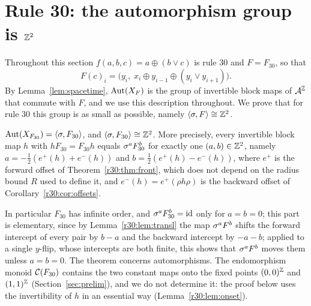 \section{Rule 30: the automorphism group is \texorpdfstring{$\mathbb{Z}^2$}{Z\^{}2}}\label{sec:rigidity30}

Throughout this section $f(a,b,c)=a\oplus(b\vee c)$ is rule $30$ and $F=F_{30}$, so that
\[
F(c)_i=\bigl(y_i,\;x_i\oplus y_{i-1}\oplus(y_i\vee y_{i+1})\bigr).
\]
By Lemma~\ref{lem:spacetime}, $\operatorname{Aut}(X_F)$ is the group of invertible block maps of $\mathcal{A}^{\mathbb{Z}}$ that commute with $F$, and we use this description throughout. We prove that for rule $30$ this group is as small as possible, namely $\langle\sigma,F\rangle\cong\mathbb{Z}^2$.

\begin{theorem}\label{thm:rigidity30}
$\operatorname{Aut}(X_{F_{30}})=\langle\sigma,F_{30}\rangle$, and $\langle\sigma,F_{30}\rangle\cong\mathbb{Z}^2$. More precisely, every invertible block map $h$ with $hF_{30}=F_{30}h$ equals $\sigma^aF_{30}^b$ for exactly one $(a,b)\in\mathbb{Z}^2$, namely $a=-\tfrac12(e^+(h)+e^-(h))$ and $b=\tfrac12(e^+(h)-e^-(h))$, where $e^+$ is the forward offset of Theorem~\ref{r30:thm:front}, which does not depend on the radius bound $R$ used to define it, and $e^-(h)=e^+(\rho h\rho)$ is the backward offset of Corollary~\ref{r30:cor:offsets}.
\end{theorem}

In particular $F_{30}$ has infinite order, and $\sigma^aF_{30}^b=\mathrm{id}$ only for $a=b=0$; this part is elementary, since by Lemma~\ref{r30:lem:transl} the map $\sigma^aF^b$ shifts the forward intercept of every pair by $b-a$ and the backward intercept by $-a-b$; applied to a single $y$-flip, whose intercepts are both finite, this shows that $\sigma^aF^b$ moves them unless $a=b=0$. The theorem concerns automorphisms. The endomorphism monoid $\mathcal{C}(F_{30})$ contains the two constant maps onto the fixed points $(0,0)^{\mathbb{Z}}$ and $(1,1)^{\mathbb{Z}}$ (Section~\ref{sec:prelim}), and we do not determine it: the proof below uses the invertibility of $h$ in an essential way (Lemma~\ref{r30:lem:onset}).

